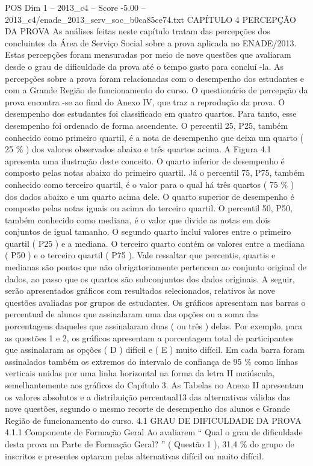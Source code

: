 \begin{textsample}{POS Dim 1 – 2013\_c4 – Score -5.00 – 2013\_c4/enade\_2013\_serv\_soc\_b0ca85ce74.txt}  \label{ex:f1_pos_385}
CAPÍTULO 4 PERCEPÇÃO DA PROVA As análises feitas neste capítulo tratam das percepções dos concluintes da Área de Serviço Social sobre a prova aplicada no ENADE/2013.
Estas percepções foram mensuradas por meio de nove questões que avaliaram desde o grau de dificuldade da prova até o tempo gasto para concluí -la.
As percepções sobre a prova foram relacionadas com o desempenho dos estudantes e com a Grande Região de funcionamento do curso.
O questionário de percepção da prova encontra -se ao final do Anexo IV, que traz a reprodução da prova.
O desempenho dos estudantes foi classificado em quatro quartos.
Para tanto, esse desempenho foi ordenado de forma ascendente.
O percentil 25, P25, também conhecido como primeiro quartil, é a nota de desempenho que deixa um quarto ( 25 \% ) dos valores observados abaixo e três quartos acima.
A Figura 4.1 apresenta uma ilustração deste conceito.
O quarto inferior de desempenho é composto pelas notas abaixo do primeiro quartil.
Já o percentil 75, P75, também conhecido como terceiro quartil, é o valor para o qual há três quartos ( 75 \% ) dos dados abaixo e um quarto acima dele.
O quarto superior de desempenho é composto pelas notas iguais ou acima do terceiro quartil.
O percentil 50, P50, também conhecido como mediana, é o valor que divide as notas em dois conjuntos de igual tamanho.
O segundo quarto inclui valores entre o primeiro quartil ( P25 ) e a mediana.
O terceiro quarto contém os valores entre a mediana ( P50 ) e o terceiro quartil ( P75 ).
Vale ressaltar que percentis, quartis e medianas são pontos que não obrigatoriamente pertencem ao conjunto original de dados, ao passo que os quartos são subconjuntos dos dados originais.
A seguir, serão apresentados gráficos com resultados selecionados, relativos às nove questões avaliadas por grupos de estudantes.
Os gráficos apresentam nas barras o percentual de alunos que assinalaram uma das opções ou a soma das porcentagens daqueles que assinalaram duas ( ou três ) delas.
Por exemplo, para as questões 1 e 2, os gráficos apresentam a porcentagem total de participantes que assinalaram as opções ( D ) difícil e ( E ) muito difícil.
Em cada barra foram assinalados também os extremos do intervalo de confiança de 95 \% como linhas verticais unidas por uma linha horizontal na forma da letra H maiúscula, semelhantemente aos gráficos do Capítulo 3.
As Tabelas no Anexo II apresentam os valores absolutos e a distribuição percentual13 das alternativas válidas das nove questões, segundo o mesmo recorte de desempenho dos alunos e Grande Região de funcionamento do curso. 4.1 GRAU DE DIFICULDADE DA PROVA 4.1.1 Componente de Formação Geral Ao avaliarem “ Qual o grau de dificuldade desta prova na Parte de Formação Geral? ” ( Questão 1 ), 31,4 \% do grupo de inscritos e presentes optaram pelas alternativas difícil ou muito difícil.

\end{textsample}
